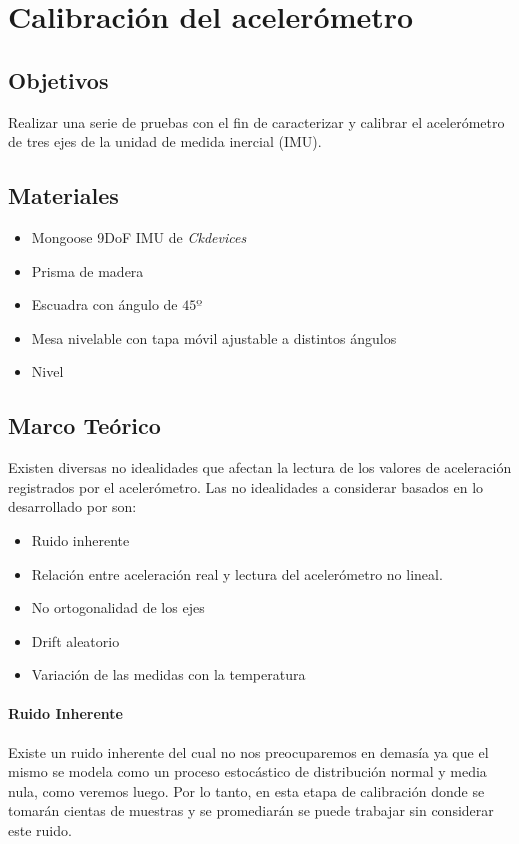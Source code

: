 \documentclass[main]{subfiles}
\begin{document}
\chapter{Calibraci\'on del acelerómetro}
\label{chap:calibracion_acelerometro}

\section{Objetivos}

Realizar una serie de pruebas con el fin de caracterizar y calibrar el acelerómetro de tres ejes de la unidad de medida inercial (IMU).

\section{Materiales}
\begin{itemize}
\item Mongoose 9DoF IMU de \emph{Ckdevices}
\item Prisma de madera
\item Escuadra con ángulo de $45º$
\item Mesa nivelable con tapa móvil ajustable a distintos ángulos
\item Nivel
\end{itemize}

\section{Marco Teórico}
Existen diversas no idealidades que afectan la lectura de los valores de aceleración registrados por el acelerómetro. Las no idealidades  a considerar basados en lo desarrollado por \cite{bib:calib_IMU} son:

\begin{itemize}
\item Ruido inherente
\item Relación entre aceleración real y lectura del acelerómetro no lineal.
\item No ortogonalidad de los ejes
\item Drift aleatorio
\item Variación de las medidas con la temperatura

\end{itemize} 

\subsubsection*{Ruido Inherente}
Existe un ruido inherente del cual no nos preocuparemos en demasía ya que el mismo se modela como un proceso estocástico de distribución normal y media nula, como veremos luego. Por lo tanto, en esta etapa de calibración donde se tomarán cientas de muestras y se promediarán se puede trabajar sin considerar este ruido.
\end{document}
